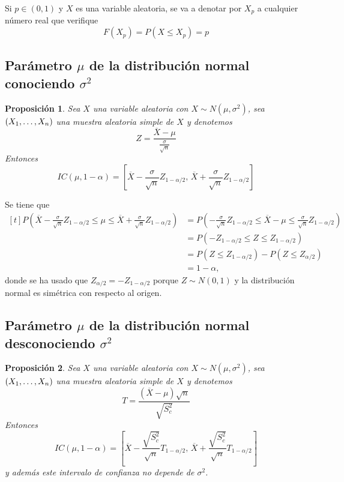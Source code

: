 \documentclass[11pt]{report}
\makeatletter
\renewenvironment{proof}[1][\proofname]{\par
  \pushQED{\qed}%
  \normalfont \topsep\z@skip %
  \trivlist
  \item[\hskip\labelsep
        \itshape
    #1\@addpunct{.}]\ignorespaces
}{%
  \popQED\endtrivlist\@endpefalse
}
\newtheorem{proposition}{Proposición}
\theoremstyle{definition}
\newcommand{\pars}[1]{\left( #1 \right)}
\makeatother
\begin{document}
Si $p \in (0,1)$ y $X$ es una variable aleatoria, se va a denotar por $X_p$ a cualquier número real que verifique
\[F(X_p) = P(X \leq X_p) = p\]

\subsection{Parámetro \texorpdfstring{$\mu$}{TEXT} de la distribución normal conociendo \texorpdfstring{$\sigma^2$}{TEXT}}

\begin{proposition}
Sea $X$ una variable aleatoria con $X \sim N(\mu,\sigma^2)$, sea $(X_1,\mathellipsis,X_n)$ una muestra aleatoria simple de $X$ y denotemos
\[Z = \frac{\overline{X}-\mu}{\frac{\sigma}{\sqrt{n}}}\]
Entonces
\[IC(\mu,1-\alpha) = \left[\overline{X}-\frac{\sigma}{\sqrt{n}}Z_{1-\alpha/2}, \, \overline{X}+\frac{\sigma}{\sqrt{n}}Z_{1-\alpha/2}\right]\]
\end{proposition}

\begin{proof}
Se tiene que
\[\begin{aligned}[t]
P\pars{\overline{X}-\frac{\sigma}{\sqrt{n}}Z_{1-\alpha/2} \leq \mu \leq \overline{X}+\frac{\sigma}{\sqrt{n}}Z_{1-\alpha/2}} 
&= P\left( -\frac{\sigma}{\sqrt{n}}Z_{1-\alpha/2} \leq \overline{X}-\mu \leq \frac{\sigma}{\sqrt{n}}Z_{1-\alpha/2}\right)
\\ &= P\pars{-Z_{1-\alpha/2} \leq Z \leq Z_{1-\alpha/2}}\\&= P(Z \leq Z_{1-\alpha/2}) - P(Z \leq Z_{\alpha/2}) \\ &=1-\alpha,
\end{aligned}\]
donde se ha usado que $Z_{\alpha/2} = -Z_{1-\alpha/2}$ porque $Z \sim N(0,1)$ y la distribución normal es simétrica con respecto al origen.
\end{proof}

\subsection{Parámetro \texorpdfstring{$\mu$}{TEXT} de la distribución normal desconociendo \texorpdfstring{$\sigma^2$}{TEXT}}

\begin{proposition}
Sea $X$ una variable aleatoria con $X \sim N(\mu,\sigma^2)$, sea $(X_1,\mathellipsis,X_n)$ una muestra aleatoria simple de $X$ y denotemos
\[T = \frac{(\overline{X}-\mu)\sqrt{n}}{\sqrt{S^2_c}}\]
Entonces
\[IC(\mu,1-\alpha) = \left[\overline{X}-\frac{\sqrt{S^2_c}}{\sqrt{n}}T_{1-\alpha/2},\, \overline{X}+\frac{\sqrt{S^2_c}}{\sqrt{n}}T_{1-\alpha/2}\right]\]
y además este intervalo de confianza no depende de $\sigma^2$.
\end{proposition}
\end{document}
